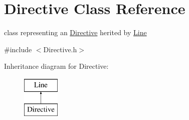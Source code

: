 \hypertarget{class_directive}{}\section{Directive Class Reference}
\label{class_directive}


class representing an \mbox{\hyperlink{class_directive}{Directive}} herited by \mbox{\hyperlink{class_line}{Line}}  




{\ttfamily \#include $<$Directive.\+h$>$}

Inheritance diagram for Directive\+:\begin{figure}[H]
\begin{center}
\leavevmode
\includegraphics[height=2.000000cm]{class_directive}
\end{center}
\end{figure}
